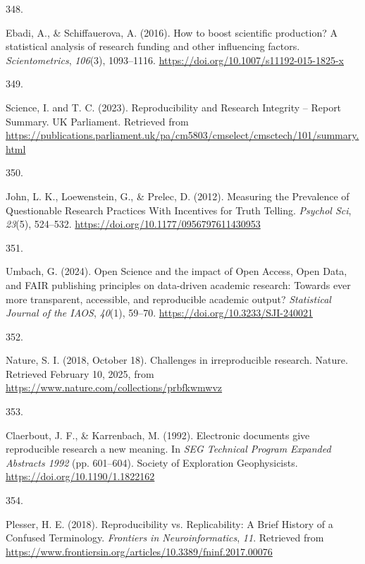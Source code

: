 \documentclass[
  11pt,
  letterpaper,
]{scrreprt}
\newlength{\cslhangindent}
\newlength{\csllabelwidth}
\newenvironment{CSLReferences}[2] %
 {\begin{list}{}{%
  \setlength{\itemindent}{0pt}
  \setlength{\leftmargin}{0pt}
  \setlength{\parsep}{0pt}
  \ifodd #1
   \setlength{\leftmargin}{\cslhangindent}
   \setlength{\itemindent}{-1\cslhangindent}
  \fi
  \setlength{\itemsep}{#2\baselineskip}}}
 {\end{list}}
\newcommand{\CSLLeftMargin}[1]{\parbox[t]{\csllabelwidth}{\strut#1\strut}}
\newcommand{\CSLRightInline}[1]{\parbox[t]{\linewidth - \csllabelwidth}{\strut#1\strut}}
\begin{document}
\begin{CSLReferences}{0}{0}
\CSLLeftMargin{348. }%
\CSLRightInline{Ebadi, A., \& Schiffauerova, A. (2016). How to boost
scientific production? {A} statistical analysis of research funding and
other influencing factors. \emph{Scientometrics}, \emph{106}(3),
1093--1116. \url{https://doi.org/10.1007/s11192-015-1825-x}}

\CSLLeftMargin{349. }%
\CSLRightInline{Science, I. and T. C. (2023). Reproducibility and
{Research Integrity} -- {Report Summary}. UK Parliament. Retrieved from
\url{https://publications.parliament.uk/pa/cm5803/cmselect/cmsctech/101/summary.html}}

\CSLLeftMargin{350. }%
\CSLRightInline{John, L. K., Loewenstein, G., \& Prelec, D. (2012).
Measuring the {Prevalence} of {Questionable Research Practices With
Incentives} for {Truth Telling}. \emph{Psychol Sci}, \emph{23}(5),
524--532. \url{https://doi.org/10.1177/0956797611430953}}

\CSLLeftMargin{351. }%
\CSLRightInline{Umbach, G. (2024). Open {Science} and the impact of
{Open Access}, {Open Data}, and {FAIR} publishing principles on
data-driven academic research: {Towards} ever more transparent,
accessible, and reproducible academic output? \emph{Statistical Journal
of the IAOS}, \emph{40}(1), 59--70.
\url{https://doi.org/10.3233/SJI-240021}}

\CSLLeftMargin{352. }%
\CSLRightInline{Nature, S. I. (2018, October 18). Challenges in
irreproducible research. Nature. Retrieved February 10, 2025, from
\url{https://www.nature.com/collections/prbfkwmwvz}}

\CSLLeftMargin{353. }%
\CSLRightInline{Claerbout, J. F., \& Karrenbach, M. (1992). Electronic
documents give reproducible research a new meaning. In \emph{{SEG
Technical Program Expanded Abstracts} 1992} (pp. 601--604). Society of
Exploration Geophysicists. \url{https://doi.org/10.1190/1.1822162}}

\CSLLeftMargin{354. }%
\CSLRightInline{Plesser, H. E. (2018). Reproducibility vs.
{Replicability}: {A Brief History} of a {Confused Terminology}.
\emph{Frontiers in Neuroinformatics}, \emph{11}. Retrieved from
\url{https://www.frontiersin.org/articles/10.3389/fninf.2017.00076}}


\end{CSLReferences}
\end{document}
